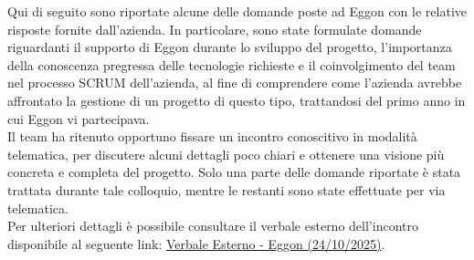 \documentclass[a4paper,11pt]{article}
\begin{document}
\parbox[t]{\linewidth}{%
Qui di seguito sono riportate alcune delle domande poste ad Eggon con le relative risposte fornite dall'azienda. In particolare, sono state formulate domande riguardanti il supporto di Eggon durante lo sviluppo del progetto, l'importanza della conoscenza pregressa delle tecnologie richieste e il coinvolgimento del team nel processo SCRUM dell'azienda, al fine di comprendere come l'azienda avrebbe affrontato la gestione di un progetto di questo tipo, trattandosi del primo anno in cui Eggon vi partecipava.\\

Il team ha ritenuto opportuno fissare un incontro conoscitivo in modalità telematica, per discutere alcuni dettagli poco chiari e ottenere una visione più concreta e completa del progetto. Solo una parte delle domande riportate è stata trattata durante tale colloquio, mentre le restanti sono state effettuate per via telematica.\\

Per ulteriori dettagli è possibile consultare il verbale esterno dell'incontro disponibile al seguente link: \href{https://bugbustersunipd.github.io/BugBusterSite/assets/docs/VERBALI_Esterni/VE_24_10_25_EggOn/VE_24_10_25_Eggon_.pdf}{Verbale Esterno - Eggon (24/10/2025)}.
}
\end{document}
